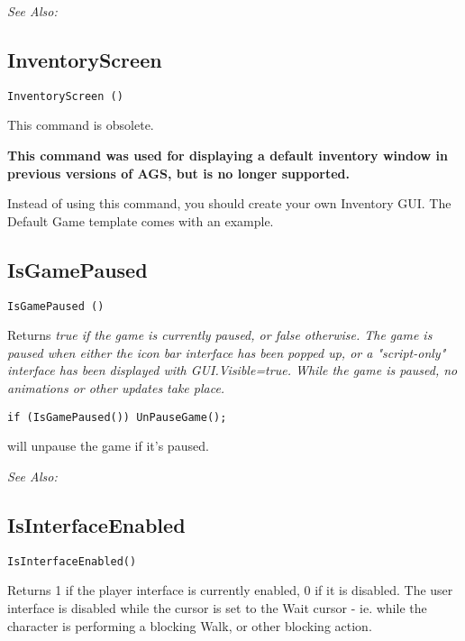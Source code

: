 \it{See Also:} 


\subsection{InventoryScreen}\label{InventoryScreen}%

\begin{verbatim}
InventoryScreen ()
\end{verbatim}

This command is obsolete.

\bf{This command was used for displaying a default inventory window
in previous versions of AGS, but is no longer supported.}

Instead of using this command, you should create your own Inventory GUI.
The Default Game template comes with an example.


\subsection{IsGamePaused}\label{IsGamePaused}%

\begin{verbatim}
IsGamePaused ()
\end{verbatim}
Returns \it{true} if the game is currently paused, or \it{false} otherwise.
The game is paused when either the icon bar interface has been popped up,
or a "script-only" interface has been displayed with GUI.Visible=true. While
the game is paused, no animations or other updates take place.

\begin{verbatim}
if (IsGamePaused()) UnPauseGame();
\end{verbatim}
will unpause the game if it's paused.

\it{See Also:} 


\subsection{IsInterfaceEnabled}\label{IsInterfaceEnabled}%

\begin{verbatim}
IsInterfaceEnabled()
\end{verbatim}
Returns 1 if the player interface is currently enabled, 0 if it is disabled.
The user interface is disabled while the cursor is set to the Wait cursor -
ie. while the character is performing a blocking Walk, or other blocking
action.

